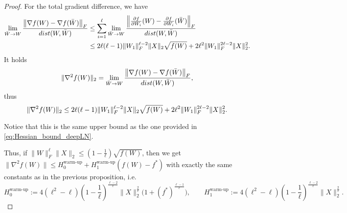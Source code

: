 \documentclass[10pt,a4paper]{amsart}
\begin{document}
\begin{proof}
For the total gradient difference, we have
\begin{align*}
  \lim_{\bar W \rightarrow W}\frac{\left\|\nabla f(W)-\nabla f(\bar W) \right\|_{\rm F}}{\textnormal{dist}(W,\bar W)} & \leq \sum_{i=1}^\ell \lim_{\bar W \rightarrow W}\frac{\left\|\frac{\partial f}{\partial W_i}(W)-\frac{\partial f}{\partial W_i}(\bar W) \right\|_{\rm F}}{\textnormal{dist}(W,\bar W)} \\ &  \leq 2 \ell (\ell-1) \|W_1\|_{\rm F}^{\ell-2} \|X\|_2 \sqrt{f(W)} + 2 \ell^2 \|W_1\|_{\rm F}^{2 \ell-2} \|X\|_2^2.
\end{align*}
It holds
\begin{equation*}
    \|\nabla^2 f(W) \|_2 = \lim_{\bar W \rightarrow W}\frac{\left\|\nabla f(W)-\nabla f(\bar W) \right\|_{\rm F}}{\textnormal{dist}(W,\bar W)},
\end{equation*}
thus
\begin{equation}
\label{eq:Hessian_bound_non_linear}
    \|\nabla^2 f(W)\|_2 \leq 2 \ell (\ell-1) \|W_1\|_{\rm F}^{\ell-2} \|X\|_2 \sqrt{f(W)} + 2 \ell^2 \|W_1\|_{\rm F}^{2 \ell-2} \|X\|_2^2.
\end{equation}

Notice that this is the same upper bound as the one provided in \eqref{eq:Hessian_bound_deepLN}.

Thus, if $\|W\|_F^{\ell} \|X\|_2 \leq (1-\frac{1}{\ell}) \sqrt{f(W)}$, then we get $\|\nabla^2 f(W)\| \leq H_0^{\text{warm-up}} + H_1^{\text{warm-up}} (f(W)-f^*)$ with exactly the same constants as in the previous proposition, i.e.
\begin{equation}
\label{eq:warmup_constants_nonlinear_network}
H_0^{\text{warm-up}}:=4(\ell^2-\ell) \left(1-\frac{1}{\ell}\right)^{\frac{\ell-2}{\ell}} \|X\|_2^{\frac{2}{\ell}}\bigl(1+(f^*)^{\frac{\ell-1}{\ell}}\bigr), \qquad H_1^{\text{warm-up}}:= 4 (\ell^2-\ell) \left(1-\frac{1}{\ell}\right)^{\frac{\ell-2}{\ell}} \|X\|_2^{\frac{2}{\ell}}.
\end{equation}







\end{proof}
\end{document}

